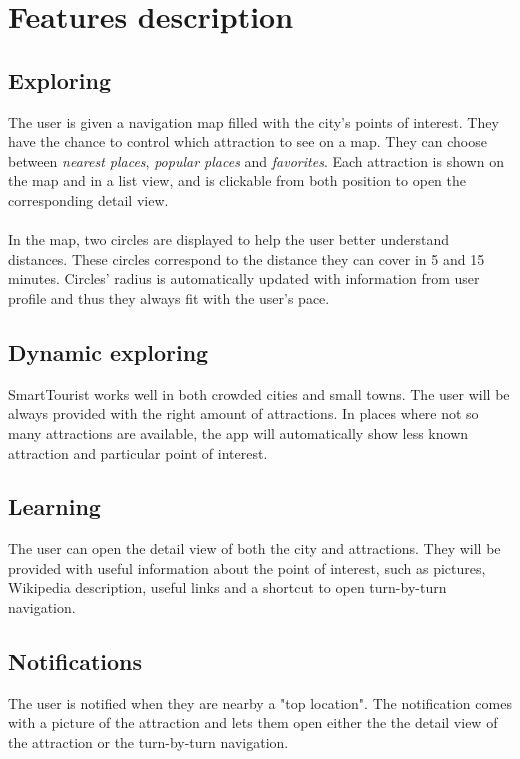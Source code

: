 \documentclass[a4paper, 11pt, parskip=half]{scrreprt}
\theoremstyle{definition}
\begin{document}
\section{Features description}

\subsection{Exploring}
The user is given a navigation map filled with the city's points of interest. They have the chance to control which attraction to see on a map. They can choose between \textit{nearest places}, \textit{popular places} and \textit{favorites}. Each attraction is shown on the map and in a list view, and is clickable from both position to open the corresponding detail view.
\\\\In the map, two circles are displayed to help the user better understand distances. These circles correspond to the distance they can cover in 5 and 15 minutes. Circles' radius is automatically updated with information from user profile and thus they always fit with the user's pace.

\subsection{Dynamic exploring}
SmartTourist works well in both crowded cities and small towns. The user will be always provided with the right amount of attractions. In places where not so many attractions are available, the app will automatically show less known attraction and particular point of interest.

\subsection{Learning}
The user can open the detail view of both the city and attractions. They will be provided with useful information about the point of interest, such as pictures, Wikipedia description, useful links and a shortcut to open turn-by-turn navigation.

\subsection{Notifications}
The user is notified when they are nearby a "top location". The notification comes with a picture of the attraction and lets them open either the the detail view of the attraction or the turn-by-turn navigation. 
\end{document}
